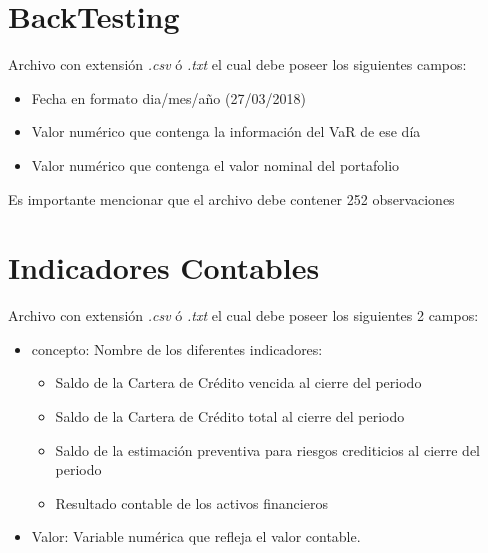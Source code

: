 \documentclass[
  12pt,
]{krantz}
\providecommand{\tightlist}{%
  \setlength{\itemsep}{0pt}\setlength{\parskip}{0pt}}
\theoremstyle{definition}
\theoremstyle{definition}
\theoremstyle{definition}
\theoremstyle{remark}
\begin{document}
\hypertarget{backtesting-2}{%
\section{BackTesting}\label{backtesting-2}}

Archivo con extensión \emph{.csv} ó \emph{.txt} el cual debe poseer los siguientes campos:

\begin{itemize}
\tightlist
\item
  Fecha en formato dia/mes/año (27/03/2018)
\item
  Valor numérico que contenga la información del VaR de ese día
\item
  Valor numérico que contenga el valor nominal del portafolio
\end{itemize}

Es importante mencionar que el archivo debe contener 252 observaciones

\hypertarget{indicadores-contables-2}{%
\section{Indicadores Contables}\label{indicadores-contables-2}}

Archivo con extensión \emph{.csv} ó \emph{.txt} el cual debe poseer los siguientes 2 campos:

\begin{itemize}
\tightlist
\item
  concepto: Nombre de los diferentes indicadores:

  \begin{itemize}
  \tightlist
  \item
    Saldo de la Cartera de Crédito vencida al cierre del periodo
  \item
    Saldo de la Cartera de Crédito total al cierre del periodo
  \item
    Saldo de la estimación preventiva para riesgos crediticios al cierre del periodo
  \item
    Resultado contable de los activos financieros
  \end{itemize}
\item
  Valor: Variable numérica que refleja el valor contable.
\end{itemize}
\end{document}
